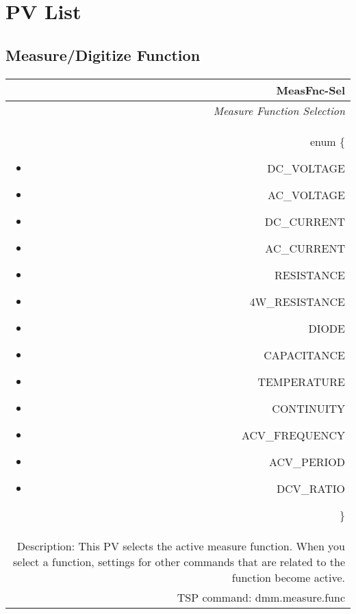 \documentclass[openany]{article}
\begin{document}
\section{PV List}

	\subsection{Measure/Digitize Function}\label{pvgroup:function}

		\paragraph{} %

		\begin{tabular}{N}
			\hline
			\bfseries MeasFnc-Sel \\ \hline
			\emph{Measure Function Selection} \\
			enum \{\begin{itemize}[noitemsep]
				\small
				\item[] DC\_VOLTAGE
				\item[] AC\_VOLTAGE
				\item[] DC\_CURRENT
				\item[] AC\_CURRENT
				\item[] RESISTANCE
				\item[] 4W\_RESISTANCE
				\item[] DIODE
				\item[] CAPACITANCE
				\item[] TEMPERATURE
				\item[] CONTINUITY
				\item[] ACV\_FREQUENCY
				\item[] ACV\_PERIOD
				\item[] DCV\_RATIO
			\end{itemize}\} \\
			Description: This PV selects the active measure function. When you select a function, settings for other commands that are related to the function become active. \\
			TSP command: dmm.measure.func
		\end{tabular}
\end{document}
